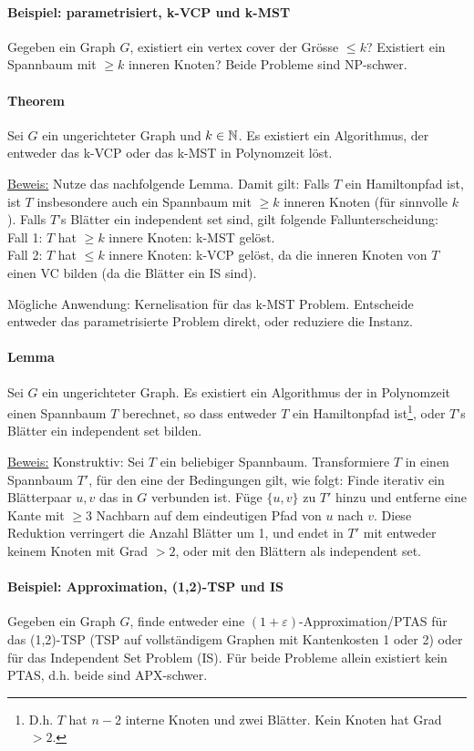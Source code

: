 \paragraph{Beispiel: parametrisiert, k-VCP und k-MST}
Gegeben ein Graph $G$, existiert ein vertex cover der Grösse $\leq k$?
Existiert ein Spannbaum mit $\geq k$ inneren Knoten?
Beide Probleme sind NP-schwer.

\paragraph{Theorem}
Sei $G$ ein ungerichteter Graph und $k \in \mathbb{N}$.
Es existiert ein Algorithmus, der entweder das k-VCP oder das k-MST in Polynomzeit löst.

\underline{Beweis:}
Nutze das nachfolgende Lemma. Damit gilt:
Falls $T$ ein Hamiltonpfad ist, ist $T$ insbesondere auch ein Spannbaum mit $\geq k$ inneren Knoten (für sinnvolle $k$).
Falls $T$'s Blätter ein independent set sind, gilt folgende Fallunterscheidung: \\
Fall 1: $T$ hat $\geq k$ innere Knoten: k-MST gelöst. \\
Fall 2: $T$ hat $\leq k$ innere Knoten: k-VCP gelöst, da die inneren Knoten von $T$ einen VC bilden
(da die Blätter ein IS sind).

Mögliche Anwendung: Kernelisation für das k-MST Problem.
Entscheide entweder das parametrisierte Problem direkt, oder reduziere die Instanz.

\paragraph{Lemma}
Sei $G$ ein ungerichteter Graph.
Es existiert ein Algorithmus der in Polynomzeit einen Spannbaum $T$ berechnet, so dass entweder $T$
ein Hamiltonpfad ist\footnote{D.h. $T$ hat $n-2$ interne Knoten und zwei Blätter. Kein Knoten hat Grad $>2$.},
oder $T$'s Blätter ein independent set bilden.

\underline{Beweis:}
Konstruktiv: Sei $T$ ein beliebiger Spannbaum.
Transformiere $T$ in einen Spannbaum $T'$, für den eine der Bedingungen gilt, wie folgt:
Finde iterativ ein Blätterpaar $u,v$ das in $G$ verbunden ist.
Füge $\{u,v\}$ zu $T'$ hinzu und entferne eine Kante mit $\geq 3$ Nachbarn auf dem
eindeutigen Pfad von $u$ nach $v$.
Diese Reduktion verringert die Anzahl Blätter um 1, und endet in $T'$ mit entweder keinem Knoten mit Grad $>2$,
oder mit den Blättern als independent set.

\paragraph{Beispiel: Approximation, (1,2)-TSP und IS}
Gegeben ein Graph $G$, finde entweder eine $(1+\varepsilon)$-Approximation/PTAS für das
(1,2)-TSP (TSP auf vollständigem Graphen mit Kantenkosten 1 oder 2) oder für das Independent Set Problem (IS).
Für beide Probleme allein existiert kein PTAS, d.h. beide sind APX-schwer.


